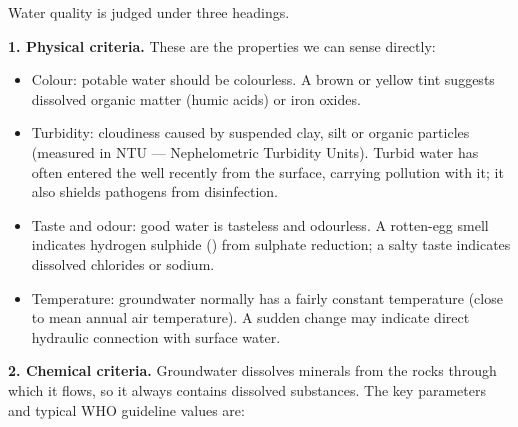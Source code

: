 \documentclass[11pt]{article}
\newcommand{\cle}[1]{{\popxbold\color{popdark}#1}}
\begin{document}
Water quality is judged under three headings.

\textbf{1. Physical criteria.} These are the properties we can sense directly:
\begin{itemize}
\item \cle{Colour}: potable water should be colourless. A brown or yellow tint suggests dissolved organic matter (humic acids) or iron oxides.
\item \cle{Turbidity}: cloudiness caused by suspended clay, silt or organic particles (measured in NTU — Nephelometric Turbidity Units). Turbid water has often entered the well recently from the surface, carrying pollution with it; it also shields pathogens from disinfection.
\item \cle{Taste and odour}: good water is tasteless and odourless. A rotten-egg smell indicates hydrogen sulphide () from sulphate reduction; a salty taste indicates dissolved chlorides or sodium.
\item \cle{Temperature}: groundwater normally has a fairly constant temperature (close to mean annual air temperature). A sudden change may indicate direct hydraulic connection with surface water.
\end{itemize}

\textbf{2. Chemical criteria.} Groundwater dissolves minerals from the rocks through which it flows, so it always contains dissolved substances. The key parameters and typical WHO guideline values are:
\end{document}
